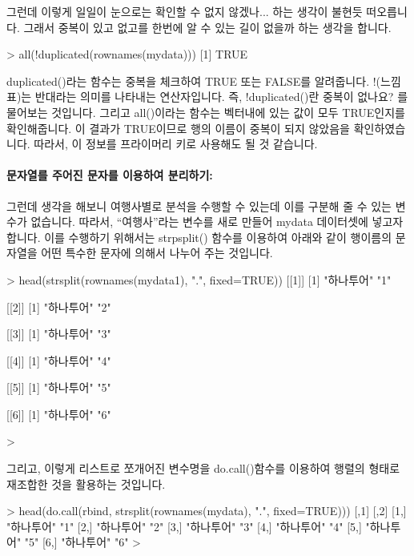 \documentclass[tutorial.tex]{subfiles}
\begin{document}
그런데 이렇게 일일이 눈으로는 확인할 수 없지 않겠나... 하는 생각이 불현듯 떠오릅니다.
그래서 중복이 있고 없고를 한번에 알 수 있는 길이 없을까 하는 생각을 합니다. 

\begin{Schunk}
\begin{Soutput}
> all(!duplicated(rownames(mydata)))
[1] TRUE
\end{Soutput}
\end{Schunk}

duplicated()라는 함수는 중복을 체크하여 TRUE 또는 FALSE를 알려줍니다.
!(느낌표)는 반대라는 의미를 나타내는 연산자입니다.
즉, !duplicated()란 중복이 없나요? 를 물어보는 것입니다.
그리고 all()이라는 함수는 벡터내에 있는 값이 모두 TRUE인지를 확인해줍니다.
이 결과가 TRUE이므로 행의 이름이 중복이 되지 않았음을 확인하였습니다.
따라서, 이 정보를 프라이머리 키로 사용해도 될 것 같습니다.

\paragraph{문자열를 주어진 문자를 이용하여 분리하기:} 
그런데 생각을 해보니 여행사별로 분석을 수행할 수 있는데 이를 구분해 줄 수 있는 변수가 없습니다.
따라서, ``여행사''라는 변수를 새로 만들어 mydata 데이터셋에 넣고자 합니다.
이를 수행하기 위해서는 strpsplit() 함수를 이용하여 아래와 같이 행이름의 문자열을 어떤 특수한 문자에 의해서 나누어 주는 것입니다.

\begin{Schunk}
\begin{Soutput}
> head(strsplit(rownames(mydata1), ".", fixed=TRUE))
[[1]]
[1] "하나투어" "1"       

[[2]]
[1] "하나투어" "2"       

[[3]]
[1] "하나투어" "3"       

[[4]]
[1] "하나투어" "4"       

[[5]]
[1] "하나투어" "5"       

[[6]]
[1] "하나투어" "6"       

>
\end{Soutput}
\end{Schunk}

그리고, 이렇게 리스트로 쪼개어진 변수명을 do.call()함수를 이용하여 행렬의 형태로 재조합한 것을 활용하는 것입니다. 

\begin{Schunk}
\begin{Soutput}
> head(do.call(rbind, strsplit(rownames(mydata), ".", fixed=TRUE)))
     [,1]       [,2]
[1,] "하나투어" "1" 
[2,] "하나투어" "2" 
[3,] "하나투어" "3" 
[4,] "하나투어" "4" 
[5,] "하나투어" "5" 
[6,] "하나투어" "6" 
> 
\end{Soutput}
\end{Schunk}
\end{document}

